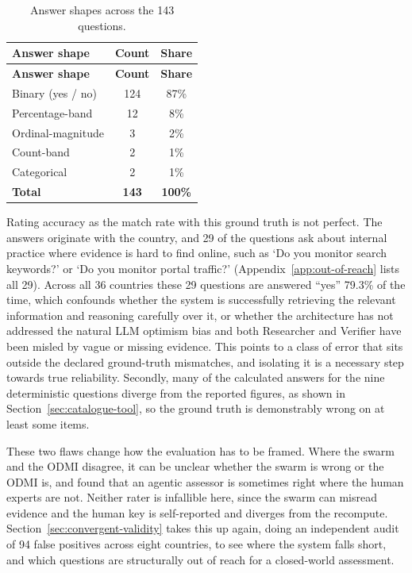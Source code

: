 {\small
\begin{longtable}[]{@{}
  L{0.5000}
  C{0.2500}
  C{0.2500}@{}}
\caption{Answer shapes across the 143 questions.}\label{tab:answer-shapes}\\
\toprule\noalign{}
\textbf{Answer shape} & \textbf{Count} & \textbf{Share} \\
\midrule\noalign{}
\endfirsthead
\toprule\noalign{}
\textbf{Answer shape} & \textbf{Count} & \textbf{Share} \\
\midrule\noalign{}
\endhead
\bottomrule\noalign{}
\endlastfoot
Binary (yes / no) & 124 & 87\% \\
Percentage-band & 12 & 8\% \\
Ordinal-magnitude & 3 & 2\% \\
Count-band & 2 & 1\% \\
Categorical & 2 & 1\% \\
\textbf{Total} & \textbf{143} & \textbf{100\%} \\
\end{longtable}
}


Rating accuracy as the match rate with this ground truth is not perfect. The answers originate with the country, and 29 of the questions ask about internal practice where evidence is hard to find online, such as `Do you monitor search keywords?' or `Do you monitor portal traffic?' (Appendix~\ref{app:out-of-reach} lists all 29). Across all 36 countries these 29 questions are answered ``yes'' 79.3\% of the time, which confounds whether the system is successfully retrieving the relevant information and reasoning carefully over it, or whether the architecture has not addressed the natural LLM optimism bias and both Researcher and Verifier have been misled by vague or missing evidence. This points to a class of error that sits outside the declared ground-truth mismatches, and isolating it is a necessary step towards true reliability. Secondly, many of the calculated answers for the nine deterministic questions diverge from the reported figures, as shown in Section~\ref{sec:catalogue-tool}, so the ground truth is demonstrably wrong on at least some items. 

These two flaws change how the evaluation has to be framed. Where the swarm and the ODMI disagree, it can be unclear whether the swarm is wrong or the ODMI is, and \citet{fumega2026} found that an agentic assessor is sometimes right where the human experts are not. Neither rater is infallible here, since the swarm can misread evidence and the human key is self-reported and diverges from the recompute. Section~\ref{sec:convergent-validity} takes this up again, doing an independent audit of 94 false positives across eight countries, to see where the system falls short, and which questions are structurally out of reach for a closed-world assessment.

